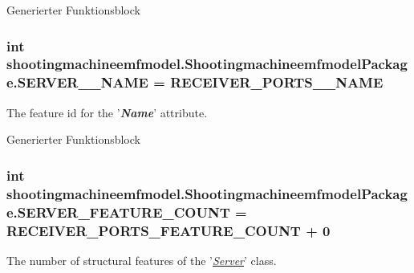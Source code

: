 Generierter Funktionsblock  \hypertarget{interfaceshootingmachineemfmodel_1_1_shootingmachineemfmodel_package_a1b1bf6175595b723626d61b7e11d7fd6}{
\subsubsection[{S\-E\-R\-V\-E\-R\-\_\-\-\_\-\-N\-A\-M\-E}]{\setlength{\rightskip}{0pt plus 5cm}int shootingmachineemfmodel.\-Shootingmachineemfmodel\-Package.\-S\-E\-R\-V\-E\-R\-\_\-\-\_\-\-N\-A\-M\-E = {\bf R\-E\-C\-E\-I\-V\-E\-R\-\_\-\-P\-O\-R\-T\-S\-\_\-\-\_\-\-N\-A\-M\-E}}}\label{interfaceshootingmachineemfmodel_1_1_shootingmachineemfmodel_package_a1b1bf6175595b723626d61b7e11d7fd6}
The feature id for the '{\itshape {\bfseries Name}}' attribute.

Generierter Funktionsblock  \hypertarget{interfaceshootingmachineemfmodel_1_1_shootingmachineemfmodel_package_a162737c771f292144dd9794302b3ac64}{
\subsubsection[{S\-E\-R\-V\-E\-R\-\_\-\-F\-E\-A\-T\-U\-R\-E\-\_\-\-C\-O\-U\-N\-T}]{\setlength{\rightskip}{0pt plus 5cm}int shootingmachineemfmodel.\-Shootingmachineemfmodel\-Package.\-S\-E\-R\-V\-E\-R\-\_\-\-F\-E\-A\-T\-U\-R\-E\-\_\-\-C\-O\-U\-N\-T = {\bf R\-E\-C\-E\-I\-V\-E\-R\-\_\-\-P\-O\-R\-T\-S\-\_\-\-F\-E\-A\-T\-U\-R\-E\-\_\-\-C\-O\-U\-N\-T} + 0}}\label{interfaceshootingmachineemfmodel_1_1_shootingmachineemfmodel_package_a162737c771f292144dd9794302b3ac64}
The number of structural features of the '{\itshape \hyperlink{interfaceshootingmachineemfmodel_1_1_server}{Server}}' class.

